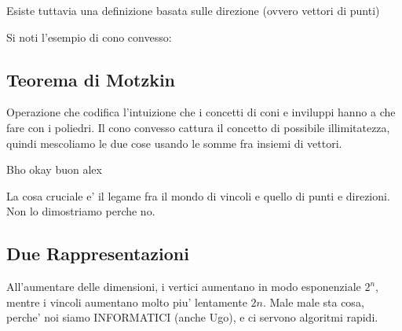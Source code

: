 Esiste tuttavia una definizione basata sulle direzione (ovvero vettori di punti)


Si noti l'esempio di cono convesso:

\subsection{Teorema di Motzkin}
Operazione che codifica l'intuizione che i concetti di coni e inviluppi hanno a che fare con i poliedri. Il cono convesso cattura il concetto di possibile illimitatezza, quindi mescoliamo le due cose usando le somme fra insiemi di vettori.

Bho okay buon alex

La cosa cruciale e' il legame fra il mondo di vincoli e quello di punti e direzioni. Non lo dimostriamo perche no.


\subsection{Due Rappresentazioni}
All'aumentare delle dimensioni, i vertici aumentano in modo esponenziale $ 2^{n} $, mentre i vincoli aumentano molto piu' lentamente $ 2n $. Male male sta cosa, perche' noi siamo INFORMATICI (anche Ugo), e ci servono algoritmi rapidi.

